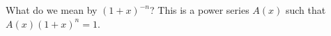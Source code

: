 

\setcounter{section}{2}
\setcounter{subsection}{4}
\setcounter{dfn}{13}


What do we mean by $(1+x)^{-n}$?
This is a power series $A(x)$ such that $A(x) (1+x)^n = 1$.



